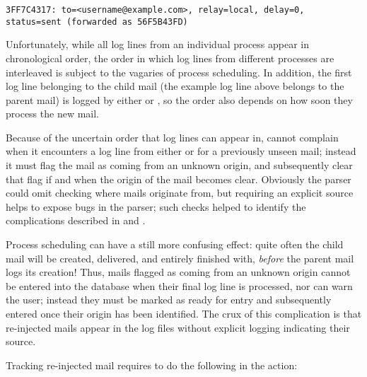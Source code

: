\texttt{3FF7C4317: to=<username@example.com>, relay=local, \hfill{}
\newline{} \tab{} \tab{} delay=0, status=sent (forwarded as 56F5B43FD)}

Unfortunately, while all log lines from an individual process appear in
chronological order, the order in which log lines from different processes
are interleaved is subject to the vagaries of process scheduling.  In
addition, the first log line belonging to the child mail (the example log
line above belongs to the parent mail) is logged by either  or
, so the order also depends on how soon they process the
new mail.

Because of the uncertain order that log lines can appear in, \parsername{}
cannot complain when it encounters a log line from either  or
 for a previously unseen mail; instead it must flag the
mail as coming from an unknown origin, and subsequently clear that flag if
and when the origin of the mail becomes clear.  Obviously the parser could
omit checking where mails originate from, but requiring an explicit source
helps to expose bugs in the parser; such checks helped to identify the
complications described in  and
.

Process scheduling can have a still more confusing effect: quite often the
child mail will be created, delivered, and entirely finished with,
\textit{before\/} the parent mail logs its creation!  Thus, mails flagged
as coming from an unknown origin cannot be entered into the database when
their final log line is processed, nor can \parsername{} warn the user;
instead they must be marked as ready for entry and subsequently entered
once their origin has been identified.  The crux of this complication is
that re-injected mails appear in the log files without explicit logging
indicating their source.

Tracking re-injected mail requires \parsername{} to do the following in the
 action:

